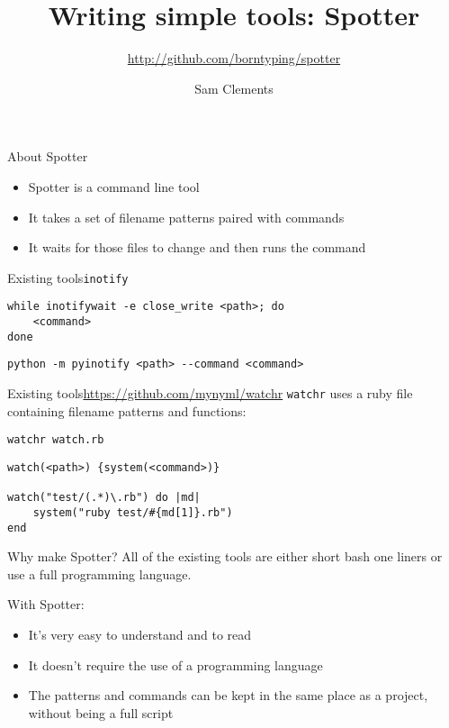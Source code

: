 \documentclass{beamer}
\title{Writing simple tools: Spotter}
\subtitle{\url{http://github.com/borntyping/spotter}}
\author{Sam Clements}
\begin{document}
\begin{frame}
    \titlepage
\end{frame}

\begin{frame}{About Spotter}
    \begin{itemize}
        \item Spotter is a command line tool
        \item It takes a set of filename patterns paired with commands
        \item It waits for those files to change and then runs the command
    \end{itemize}
\end{frame}

\begin{frame}[fragile]{Existing tools}{\texttt{inotify}}
\begin{verbatim}
while inotifywait -e close_write <path>; do
    <command>
done
\end{verbatim}
\begin{verbatim}
python -m pyinotify <path> --command <command>
\end{verbatim}
\end{frame}

\begin{frame}[fragile]{Existing tools}{\url{https://github.com/mynyml/watchr}}
\texttt{watchr} uses a ruby file containing filename patterns and functions:
\begin{verbatim}
watchr watch.rb
\end{verbatim}
\begin{verbatim}
watch(<path>) {system(<command>)}

watch("test/(.*)\.rb") do |md|
    system("ruby test/#{md[1]}.rb")
end
\end{verbatim}
\end{frame}
    
\begin{frame}{Why make Spotter?}
    All of the existing tools are either short bash one liners or use a full programming language. \vspace{1em}

    With Spotter:
    \begin{itemize}
        \item It's very easy to understand and to read
        \item It doesn't require the use of a programming language
        \item The patterns and commands can be kept in the same place as a project, without being a full script
    \end{itemize}
\end{frame}
\end{document}
